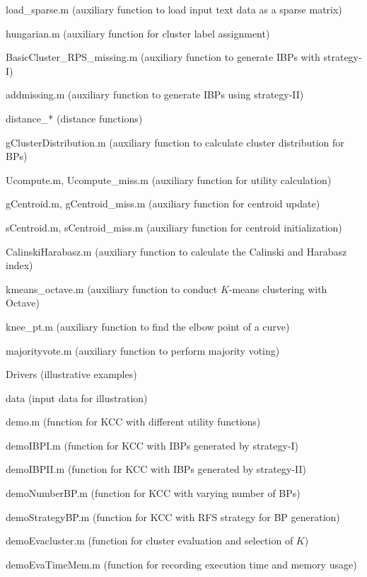 \documentclass[10pt]{acmtrans2e}
\begin{document}
\begin{compactitem}
\begin{compactitem}
   \item \textsf{load\_sparse.m} (auxiliary function to load input text data as a sparse matrix)
   \item \textsf{hungarian.m} (auxiliary function for cluster label assignment)
   \item \textsf{BasicCluster\_RPS\_missing.m} (auxiliary function to generate IBPs with strategy-I)
   \item \textsf{addmissing.m} (auxiliary function to generate IBPs using strategy-II)
   \item \textsf{distance\_*} (distance functions)
   \item \textsf{gClusterDistribution.m} (auxiliary function to calculate cluster distribution for BPs)
   \item \textsf{Ucompute.m, Ucompute\_miss.m} (auxiliary function for utility calculation)
   \item \textsf{gCentroid.m, gCentroid\_miss.m} (auxiliary function for centroid update)
   \item \textsf{sCentroid.m, sCentroid\_miss.m} (auxiliary function for centroid initialization)
   \item \textsf{CalinskiHarabasz.m} (auxiliary function to calculate the Calinski and Harabasz index)
   \item \textsf{kmeans\_octave.m} (auxiliary function to conduct $K$-means clustering with Octave)
   \item \textsf{knee\_pt.m} (auxiliary function to find the elbow point of a curve)
   \item \textsf{majorityvote.m} (auxiliary function to perform majority voting)
  \end{compactitem}
  \item \textsf{Drivers} (illustrative examples)
  \begin{compactitem}
   \item \textsf{data} (input data for illustration)
   \item \textsf{demo.m} (function for KCC with different utility functions)
   \item \textsf{demoIBPI.m} (function for KCC with IBPs generated by strategy-I)
   \item \textsf{demoIBPII.m} (function for KCC with IBPs generated by strategy-II)
   \item \textsf{demoNumberBP.m} (function for KCC with varying number of BPs)
   \item \textsf{demoStrategyBP.m} (function for KCC with RFS strategy for BP generation)
   \item \textsf{demoEvacluster.m} (function for cluster evaluation and selection of $K$)
   \item \textsf{demoEvaTimeMem.m} (function for recording execution time and memory usage)
  \end{compactitem}
\end{compactitem}
\end{document}

